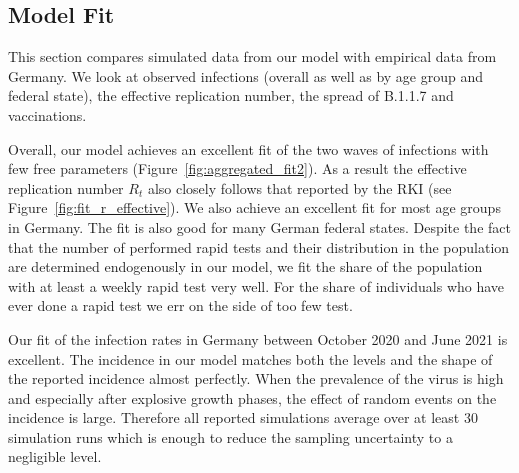 \subsection{Model Fit}
\label{subsec:fit_results}

This section compares simulated data from our model with empirical data from Germany. We
look at observed infections (overall as well as by age group and federal state), the
effective replication number,  the spread of B.1.1.7 and vaccinations.

Overall, our model achieves an excellent fit of the two waves of infections with few free
parameters (Figure~\ref{fig:aggregated_fit2}). As a result the effective replication
number $R_t$ also closely follows that reported by the RKI (see
Figure~\ref{fig:fit_r_effective}). We also achieve an excellent fit for most age groups
in Germany. The fit is also good for many German federal states. Despite the fact that
the number of performed rapid tests and their distribution in the population are
determined endogenously in our model, we fit the share of the population with at least a
weekly rapid test very well. For the share of individuals who have ever done a rapid test
we err on the side of too few test.

Our fit of the infection rates in Germany between October 2020 and June 2021 is
excellent. The incidence in our model matches both the levels and the shape of the
reported incidence almost perfectly. When the prevalence of the virus is high and
especially after explosive growth phases, the effect of random events on the
incidence is large. Therefore all reported simulations average over at least 30
simulation runs which is enough to reduce the sampling uncertainty to a negligible
level.

